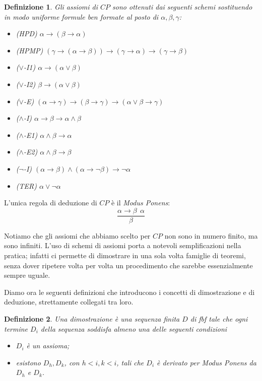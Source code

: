 \documentclass[a4paper, titlepage, 12pt]{report}
\newtheorem{definition}{Definizione}
\begin{document}
\begin{definition}
Gli assiomi di $CP$ sono ottenuti dai seguenti schemi
sostituendo in modo uniforme formule ben formate al posto di $\alpha, \beta, \gamma$:
\begin{itemize}
\item (HPD) $\alpha \rightarrow (\beta \rightarrow \alpha)$
\item (HPMP) $(\gamma \rightarrow (\alpha \rightarrow \beta)) \rightarrow (\gamma \rightarrow \alpha) \rightarrow (\gamma \rightarrow \beta)$
\item ($\lor$-I1) $\alpha \rightarrow (\alpha \lor \beta)$
\item ($\lor$-I2) $\beta \rightarrow (\alpha \lor \beta)$
\item ($\lor$-E) $(\alpha \rightarrow \gamma) \rightarrow (\beta \rightarrow \gamma) \rightarrow (\alpha \lor \beta \rightarrow \gamma)$
\item ($\land$-I) $\alpha \rightarrow \beta \rightarrow \alpha \land \beta$
\item ($\land$-E1) $\alpha \land \beta \rightarrow \alpha$
\item ($\land$-E2) $\alpha \land \beta \rightarrow \beta$
\item ($\neg$-I) $(\alpha \rightarrow \beta) \land (\alpha \rightarrow \neg \beta) \rightarrow \neg \alpha$
\item (TER) $\alpha \lor \neg \alpha$
\end{itemize}
\end{definition}

L'unica regola di deduzione di $CP$ è il \textit{Modus Ponens}:
$$\frac{\alpha \rightarrow \beta \ \ \alpha}{\beta}$$

Notiamo che gli assiomi che abbiamo scelto per $CP$ non sono in numero finito,
ma sono infiniti. L'uso di schemi di assiomi porta a notevoli semplificazioni
nella pratica; infatti ci permette di dimostrare in una sola volta famiglie di teoremi,
senza dover ripetere volta per volta un procedimento che sarebbe essenzialmente sempre uguale.

Diamo ora le seguenti definizioni che introducono i concetti di dimostrazione e di
deduzione, strettamente collegati tra loro.

\begin{definition}
Una dimostrazione è una sequenza finita $D$ di fbf tale che
ogni termine $D_i$ della sequenza soddisfa almeno una delle seguenti condizioni
\begin{itemize}
\item $D_i$ è un assioma;
\item esistono $D_h, D_k$, con $h < i, k < i$, tali che $D_i$ è derivato per \textit{Modus Ponens}
da $D_h$ e $D_k$.
\end{itemize}
\end{definition}
\end{document}
